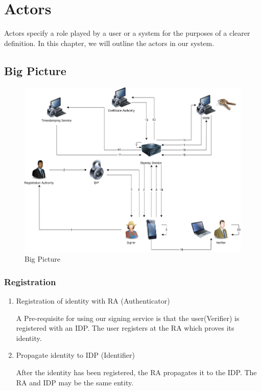\chapter{Actors}
\label{ch:actors}

Actors specify a role played by a user or a system for the purposes of a clearer definition.
In this chapter, we will outline the actors in our system.

\begin{landscape}
	\section{Big Picture}
	\begin{figure}[H]
		\begin{center}
			\includegraphics[scale=0.6]{images/BigPicture.png}
			\caption{Big Picture}
			\label{fig:bigpicture}
		\end{center}
	\end{figure}
\end{landscape}

\subsection{Registration}
\begin{enumerate}
	\item Registration of identity with \gls{RA} (Authenticator)
	
	A Pre-requisite for using our signing service is that the user(Verifier) is registered with an \gls{IDP}.
	The user registers at the \gls{RA} which proves its identity.
	
	\item Propagate identity to \gls{IDP} (Identifier)
	
	After the identity has been registered, the \gls{RA} propagates it to the \gls{IDP}.
	The \gls{RA} and \gls{IDP} may be the same entity.
\end{enumerate}

